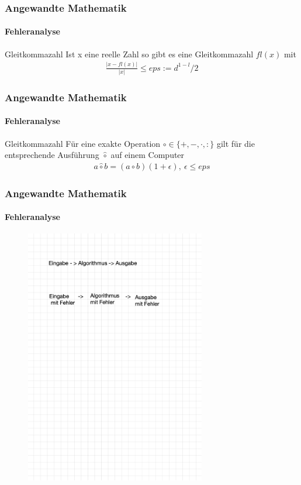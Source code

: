 \documentclass{beamer}
\begin{document}
\begin{frame}
    \frametitle{Angewandte Mathematik}
\framesubtitle{Fehleranalyse}
    \begin{block}{Gleitkommazahl}
Ist x eine reelle Zahl so gibt es eine  Gleitkommazahl $fl(x)$ mit
\begin{align*}
\frac{|x-fl(x)| }{|x|} \leq eps := d^{1-l}/2
\end{align*}
\end{block}

 \end{frame}



\begin{frame}
    \frametitle{Angewandte Mathematik}
\framesubtitle{Fehleranalyse}
    \begin{block}{Gleitkommazahl}
Für eine exakte Operation $\circ \in \{+,-, \cdot, : \}$ gilt für die entsprechende Ausführung $\hat{\circ}$ auf einem Computer
\begin{align*}
a \hat{\circ}  b = (a \circ b) (1  + \epsilon) , \ \epsilon \leq eps 
\end{align*}
\end{block}
 \end{frame}


 \begin{frame}
    \frametitle{Angewandte Mathematik}
\framesubtitle{Fehleranalyse}
\begin{figure}[H]
      \centering
    \includegraphics[width=0.7\textwidth]{images/fehler}\end{figure}
 \end{frame}
\end{document}
